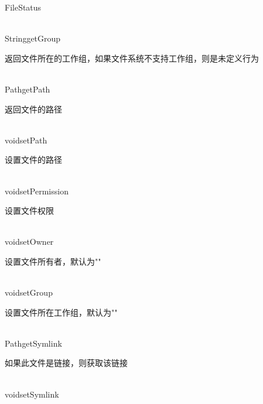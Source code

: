 \begin{XeClass}{FileStatus}
  \begin{XeMethod}{\XePublic\\ }{String}{getGroup}
       
 返回文件所在的工作组，如果文件系统不支持工作组，则是未定义行为

  \end{XeMethod}

  \begin{XeMethod}{\XePublic\\ }{Path}{getPath}
       
 返回文件的路径

  \end{XeMethod}

  \begin{XeMethod}{\XePublic\\ }{void}{setPath}
       
 设置文件的路径

  \end{XeMethod}

  \begin{XeMethod}{\XeProtected\\ }{void}{setPermission}
       
 设置文件权限

  \end{XeMethod}

  \begin{XeMethod}{\XeProtected\\ }{void}{setOwner}
       
 设置文件所有者，默认为""

  \end{XeMethod}

  \begin{XeMethod}{\XeProtected\\ }{void}{setGroup}
       
 设置文件所在工作组，默认为""

  \end{XeMethod}

  \begin{XeMethod}{\XePublic\\ }{Path}{getSymlink}
       
 如果此文件是链接，则获取该链接

  \end{XeMethod}

  \begin{XeMethod}{\XePublic\\ }{void}{setSymlink}
       

\end{XeMethod}
\end{XeClass}
